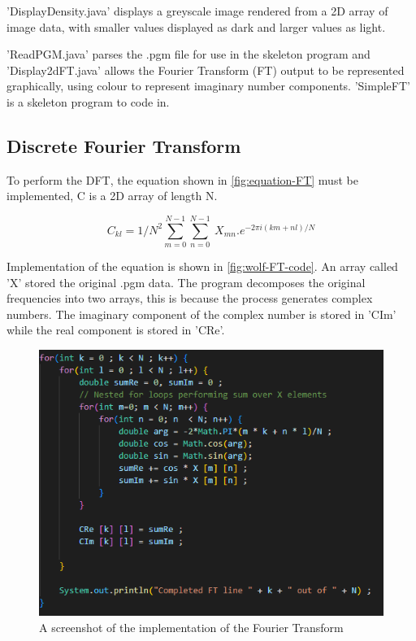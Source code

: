     'DisplayDensity.java' displays a greyscale image rendered from a 2D array of image data, with smaller values displayed as dark and larger values as light.
    
    'ReadPGM.java' parses the .pgm file for use in the skeleton program and 'Display2dFT.java' allows the Fourier Transform (FT) output to be represented graphically, using colour to represent imaginary number components. 'SimpleFT' is a skeleton program to code in.
    

    
    \subsection{Discrete Fourier Transform}
    To perform the DFT, the equation shown in \autoref{fig:equation-FT} must be implemented, C is a 2D array of length N.
    
    \begin{center}
        \begin{equation}
            C_{kl} = 1/N^2 \sum_{m=0}^{N-1} \sum_{n=0}^{N-1}\ X_{mn} . e^{-2\pi i(km+nl)/N}
            \label{fig:equation-FT}
        \end{equation}  
    \end{center}%

    Implementation of the equation is shown in \autoref{fig:wolf-FT-code}. An array called 'X' stored the original .pgm data. The program decomposes the original frequencies into two arrays, this is because the process generates complex numbers. The imaginary component of the complex number is stored in 'CIm' while the real component is stored in 'CRe'. 
 
    \begin{figure}[H]
        \centering
        \includegraphics[width=1\columnwidth]{Figures/Week 1/W1-SimpleFT-Completed-For-Loop.png}
        \caption{A screenshot of the implementation of the Fourier Transform}
        \label{fig:wolf-FT-code}
    \end{figure}

